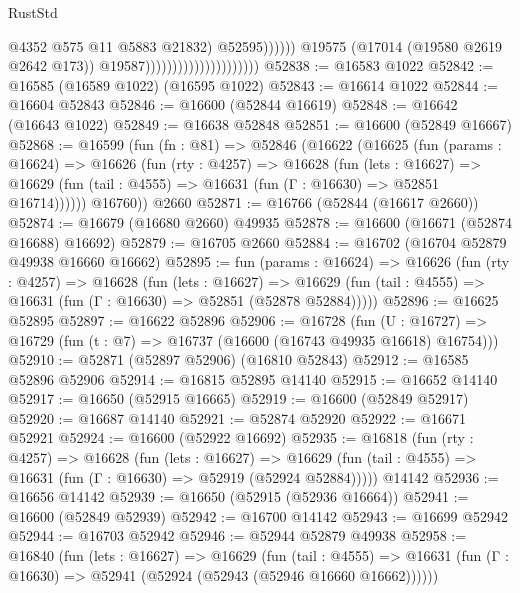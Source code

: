 \begin{lexlean}{RustStd}
\begin{coremodule}
{\begin{coremodule}
{{{{{{{{{{{{{{{{{{{{{{{{{{{{{{{{{{{{{{{{{{{{{{{{{{{{{{{                                                            @4352
                                                            @575
                                                            @11
                                                            @5883
                                                            @21832)
                                                          @52595))))))
                                              @19575
                                              (@17014 (@19580 @2619 @2642 @173))
                                              @19587)))))))))))))))))))))
@52838 := @16583 @1022
@52842 := @16585 (@16589 @1022) (@16595 @1022)
@52843 := @16614 @1022
@52844 := @16604 @52843
@52846 := @16600 (@52844 @16619)
@52848 := @16642 (@16643 @1022)
@52849 := @16638 @52848
@52851 := @16600 (@52849 @16667)
@52868 := @16599
    (fun (fn : @81) =>
    @52846
      (@16622
        (@16625
          (fun (params : @16624) =>
          @16626
            (fun (rty : @4257) =>
            @16628
              (fun (lets : @16627) =>
              @16629 (fun (tail : @4555) => @16631 (fun (Γ : @16630) => @52851 @16714))))))
        @16760))
    @2660
@52871 := @16766 (@52844 (@16617 @2660))
@52874 := @16679 (@16680 @2660) @49935
@52878 := @16600 (@16671 (@52874 @16688) @16692)
@52879 := @16705 @2660
@52884 := @16702 (@16704 @52879 @49938 @16660 @16662)
@52895 := fun (params : @16624) =>
  @16626
    (fun (rty : @4257) =>
    @16628
      (fun (lets : @16627) =>
      @16629 (fun (tail : @4555) => @16631 (fun (Γ : @16630) => @52851 (@52878 @52884)))))
@52896 := @16625 @52895
@52897 := @16622 @52896
@52906 := @16728
    (fun (U : @16727) => @16729 (fun (t : @7) => @16737 (@16600 (@16743 @49935 @16618) @16754)))
@52910 := @52871 (@52897 @52906) (@16810 @52843)
@52912 := @16585 @52896 @52906
@52914 := @16815 @52895 @14140
@52915 := @16652 @14140
@52917 := @16650 (@52915 @16665)
@52919 := @16600 (@52849 @52917)
@52920 := @16687 @14140
@52921 := @52874 @52920
@52922 := @16671 @52921
@52924 := @16600 (@52922 @16692)
@52935 := @16818
    (fun (rty : @4257) =>
    @16628
      (fun (lets : @16627) =>
      @16629 (fun (tail : @4555) => @16631 (fun (Γ : @16630) => @52919 (@52924 @52884)))))
    @14142
@52936 := @16656 @14142
@52939 := @16650 (@52915 (@52936 @16664))
@52941 := @16600 (@52849 @52939)
@52942 := @16700 @14142
@52943 := @16699 @52942
@52944 := @16703 @52942
@52946 := @52944 @52879 @49938
@52958 := @16840
    (fun (lets : @16627) =>
    @16629
      (fun (tail : @4555) =>
      @16631 (fun (Γ : @16630) => @52941 (@52924 (@52943 (@52946 @16660 @16662))))))
}}}}}}}}}}}}}}}}}}}}}}}}}}}}}}}}}}}}}}}}}}}}}}}}}}}}}}}
\end{coremodule}}
\end{coremodule}
\end{lexlean}
